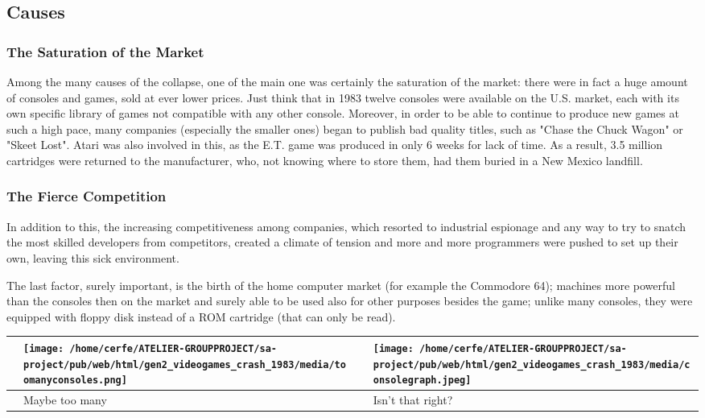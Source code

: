 \documentclass[a4paper,10pt]{book}
\begin{document}
 \subsection{Causes }
 \subsubsection{The Saturation of the Market }
  Among the many causes of the collapse, one of the main one was certainly the saturation of the market:
        there were in fact a huge amount of consoles and games, sold at ever lower prices. Just think that in 1983 twelve consoles
        were available on the U.S. market, each with its own specific library of games not compatible with any other console.
        Moreover, in order to be able to continue to produce new games at such a high pace, many companies (especially
        the smaller ones) began to publish bad quality titles, such as "Chase the Chuck Wagon" or "Skeet Lost".
         Atari 
        was also involved in this, as the E.T. game was produced in only 6 weeks for lack of time. As a result, 3.5
        million cartridges were returned to the manufacturer, who, not knowing where to store them, had them buried
        in a New Mexico landfill.
         
 \subsubsection{The Fierce Competition }
        In addition to this, the increasing competitiveness among companies, which resorted to industrial
        espionage and any way to try to snatch the most skilled developers from competitors, created a climate
        of tension and more and more programmers were pushed to set up their own, leaving this sick environment.
         
        The last factor, surely important, is the birth of the home computer market (for example the Commodore 64);
        machines more powerful than the consoles then on the market and surely able to be used also for other purposes
        besides the game; unlike many consoles, they were equipped with floppy disk instead of a ROM cartridge (that can only
        be read).
         \begin{longtable}{p{1mm}|l|l|l|}\hline
 
 & \textbf{\texttt{[image: /home/cerfe/ATELIER-GROUPPROJECT/sa-project/pub/web/html/gen2\_videogames\_crash\_1983/media/toomanyconsoles.png]}} 
 & \textbf{} 
 & \textbf{\texttt{[image: /home/cerfe/ATELIER-GROUPPROJECT/sa-project/pub/web/html/gen2\_videogames\_crash\_1983/media/consolegraph.jpeg]}} 
 \\\hline
 
 & Maybe too many 
 & 
 & Isn't that right? 
 \\\hline
 \end{longtable}
 
\end{document}
